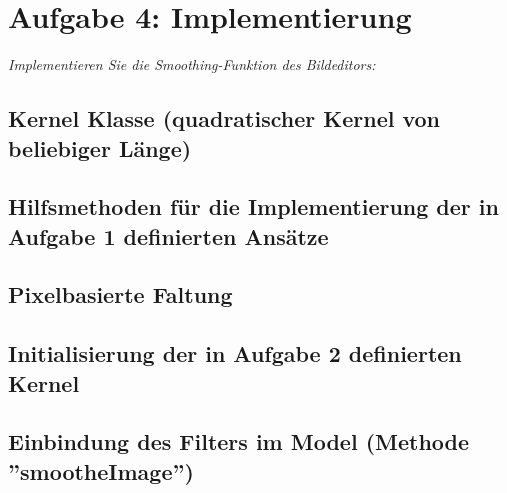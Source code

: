 \documentclass{article}
\begin{document}
\section{Aufgabe 4: Implementierung}
\textit{Implementieren Sie die Smoothing-Funktion des Bildeditors:}

\subsection{Kernel Klasse (quadratischer Kernel von beliebiger Länge)}
\subsection{Hilfsmethoden für die Implementierung der in Aufgabe 1 definierten Ansätze}
\subsection{Pixelbasierte Faltung}
\subsection{Initialisierung der in Aufgabe 2 definierten Kernel}
\subsection{Einbindung des Filters im Model (Methode ”smootheImage”)}
\end{document}

